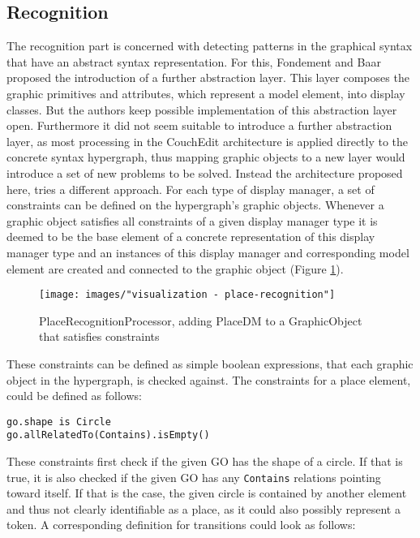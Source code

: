 \subsection{Recognition}
The recognition part is concerned with detecting patterns in the graphical syntax that have an abstract syntax representation. For this, Fondement and Baar proposed the introduction of a further abstraction layer. This layer composes the graphic primitives and attributes, which represent a model element, into display classes. But the authors keep possible implementation of this abstraction layer open. Furthermore it did not seem suitable to introduce a further abstraction layer, as most processing in the CouchEdit architecture is applied directly to the concrete syntax hypergraph, thus mapping graphic objects to a new layer would introduce a set of new problems to be solved. Instead the architecture proposed here, tries a different approach. For each type of display manager, a set of constraints can be defined on the hypergraph's graphic objects. Whenever a graphic object satisfies all constraints of a given display manager type it is deemed to be the base element of a concrete representation of this display manager type and an instances of this display manager and corresponding model element are created and connected to the graphic object (Figure \ref{fig:place-recognition}). 

\begin{figure}
  \centering
  \texttt{[image: images/"visualization - place-recognition"]}
  \caption{PlaceRecognitionProcessor, adding PlaceDM to a GraphicObject that satisfies constraints}
  \label{fig:place-recognition}
\end{figure}

These constraints can be defined as simple boolean expressions, that each graphic object in the hypergraph, is checked against. The constraints for a place element, could be defined as follows: 

\begin{lstlisting}[language=OCL,caption={Possible constraints to detect GOs representing a place},captionpos=b]
go.shape is Circle
go.allRelatedTo(Contains).isEmpty()
\end{lstlisting} 

These constraints first check if the given GO has the shape of a circle. If that is true, it is also checked if the given GO has any \texttt{Contains} relations pointing toward itself. If that is the case, the given circle is contained by another element and thus not clearly identifiable as a place, as it could also possibly represent a token. A corresponding definition for transitions could look as follows: 

